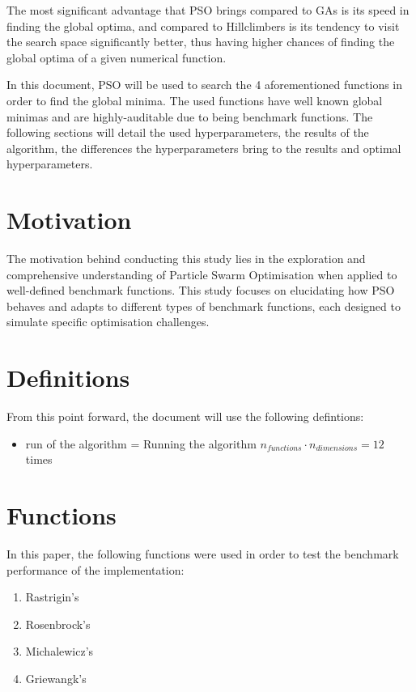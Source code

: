 \documentclass[conference]{IEEEtran}
\begin{document}
The most significant advantage that PSO brings compared to GAs is its speed in finding the global optima, and compared to Hillclimbers
is its tendency to visit the search space significantly better, thus having higher chances of finding the global optima of a
given numerical function.

In this document, PSO will be used to search the 4 aforementioned functions in order to find the global minima. The used functions
have well known global minimas and are highly-auditable due to being benchmark functions. The following sections will
detail the used hyperparameters, the results of the algorithm, the differences the hyperparameters bring to the results and
optimal hyperparameters.

\section{Motivation}
The motivation behind conducting this study lies in the exploration and comprehensive understanding of Particle Swarm Optimisation
when applied to well-defined benchmark functions. This study focuses on elucidating how PSO behaves and adapts to different
types of benchmark functions, each designed to simulate specific optimisation challenges.

\section{Definitions}
From this point forward, the document will use the following defintions:

\begin{itemize}
    \item run of the algorithm = Running the algorithm $n_{functions} \cdot n_{dimensions} = 12$ times
\end{itemize}

\section{Functions}
In this paper, the following functions were used in order to test the benchmark performance of the implementation:

\begin{enumerate}
    \item Rastrigin's
    \item Rosenbrock's
    \item Michalewicz's
    \item Griewangk's
\end{enumerate}
\end{document}
